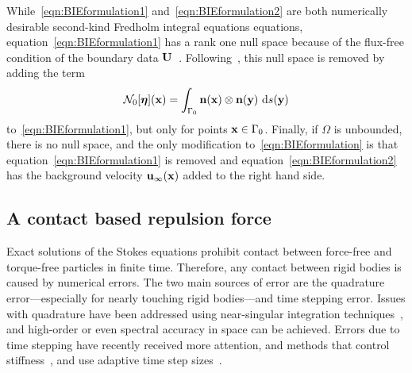 \documentclass[preprint, 10pt]{elsarticle}
\begin{document}
While~\eqref{eqn:BIEformulation1} and~\eqref{eqn:BIEformulation2} are
both numerically desirable second-kind Fredholm integral equations
equations, equation~\eqref{eqn:BIEformulation1} has a rank one null
space because of the flux-free condition of the boundary data
${\mathbf{U}}$~\cite{Ladyzhenskaya1963}.  Following~\cite{Power1993}, this null
space is removed by adding the term 
\begin{align}
\label{eqn:N0_modification} 
  \mathcal{N}_0[{\boldsymbol\eta}]({\mathbf{x}}) = \int_{\Gamma_0} 
    {\mathbf{n}}({\mathbf{x}})\otimes{\mathbf{n}}({\mathbf{y}})~\text{d}s({\mathbf{y}})
\end{align}
to~\eqref{eqn:BIEformulation1}, but only for points ${\mathbf{x}} \in \Gamma_0$.
Finally, if $\Omega$ is unbounded, there is no null space, and
the only modification to~\eqref{eqn:BIEformulation} is that
equation~\eqref{eqn:BIEformulation1} is removed and
equation~\eqref{eqn:BIEformulation2} has the background velocity
${\mathbf{u}}_\infty({\mathbf{x}})$ added to the right hand side.


\subsection{A contact based repulsion force}
\label{sec:repulsion}
Exact solutions of the Stokes equations prohibit contact between
force-free and torque-free particles in finite time.  Therefore, any
contact between rigid bodies is caused by numerical errors.  The two main sources of error are
the quadrature error---especially for nearly touching rigid bodies---and
time stepping error.  Issues with quadrature have been addressed using
near-singular integration techniques~\cite{Ying2006, Klockner2013,
Quaife2014, Barnett2015, Beale2001, Cortez2001},
and high-order or even spectral accuracy in space can be achieved.
Errors due to time stepping have recently received more attention, and
methods that control stiffness~\cite{Quaife2014}, and use adaptive time step
sizes~\cite{Kropinski1999,
Quaife2015, Sorgentone2018}.

\end{document}
